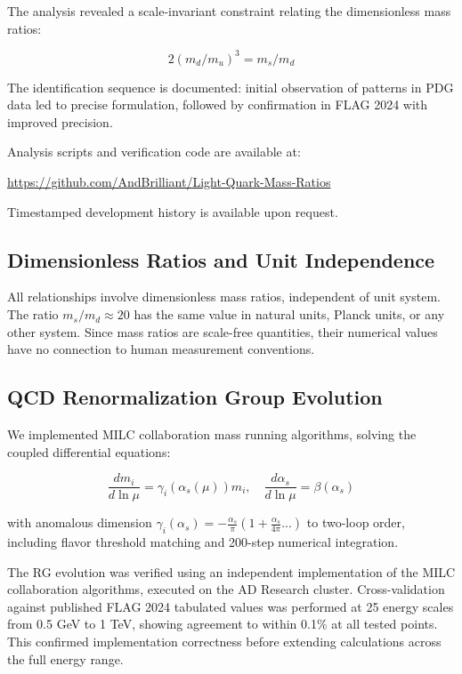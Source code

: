 \documentclass[12pt]{article}
\begin{document}
The analysis revealed a scale-invariant constraint relating the dimensionless mass ratios:

\begin{equation}
2(m_d/m_u)^3 = m_s/m_d
\end{equation}

The identification sequence is documented: initial observation of patterns in PDG data led to precise formulation, followed by confirmation in FLAG 2024 with improved precision.

Analysis scripts and verification code are available at:

\url{https://github.com/AndBrilliant/Light-Quark-Mass-Ratios}

Timestamped development history is available upon request.

\subsection{Dimensionless Ratios and Unit Independence}

All relationships involve dimensionless mass ratios, independent of unit system. The ratio $m_s/m_d \approx 20$ has the same value in natural units, Planck units, or any other system. Since mass ratios are scale-free quantities, their numerical values have no connection to human measurement conventions.

\subsection{QCD Renormalization Group Evolution}

We implemented MILC collaboration mass running algorithms, solving the coupled differential equations:

\begin{equation}
\frac{dm_i}{d\ln\mu} = \gamma_i(\alpha_s(\mu))m_i,\quad \frac{d\alpha_s}{d\ln\mu} = \beta(\alpha_s)
\end{equation}

with anomalous dimension $\gamma_i(\alpha_s) = -\frac{\alpha_s}{\pi}\left(1 + \frac{\alpha_s}{4\pi}...\right)$ to two-loop order, including flavor threshold matching and 200-step numerical integration.

The RG evolution was verified using an independent implementation of the MILC collaboration algorithms, executed on the AD Research cluster. Cross-validation against published FLAG 2024 tabulated values was performed at 25 energy scales from 0.5 GeV to 1 TeV, showing agreement to within 0.1\% at all tested points. This confirmed implementation correctness before extending calculations across the full energy range.
\end{document}

